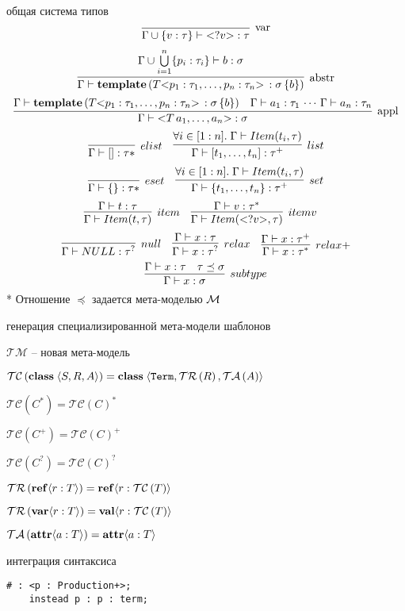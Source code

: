 общая система типов
$$
\trule{}{\Gamma \cup \{v : \tau\} \vdash \ang{?v} : \tau}{var}
$$ 
$$
\trule{
	\Gamma \cup \bigcup\limits_{i=1}^{n} \{ p_i : \tau_i \} \vdash b : \sigma
}{
	\Gamma \vdash \mathbf{template}\left(
		T \ang{p_1 : \tau_1, \ldots, p_n : \tau_n} \,: \sigma \, \{ b \}
	\right)
}{abstr}
$$ 
$$
\trule{
	\Gamma \vdash \mathbf{template}\left(
		T \ang{p_1 : \tau_1, \ldots, p_n : \tau_n} \,: \sigma \, \{ b \}
	\right)
	&
	\Gamma \vdash a_1 : \tau_1 \, \cdots \, \Gamma \vdash a_n : \tau_n
}{
	\Gamma \vdash \ang{T \, a_1, \ldots, a_n} : \sigma
}{appl}
$$
$$
\infer[elist]{\Gamma \vdash [] : \tau*}{}
\quad
\infer[list]{
	\Gamma \vdash [t_1,\ldots,t_n] : \tau^+
}{
	\forall i \in [1:n].\; \Gamma \vdash Item(t_i, \tau)
}
$$
$$
\infer[eset]{\Gamma \vdash \{\} : \tau*}{}
\quad
\infer[set]{
	\Gamma \vdash \{t_1,\ldots,t_n\} : \tau^+
}{
	\forall i \in [1:n].\; \Gamma \vdash Item(t_i, \tau)
}
$$
$$
\infer[item]{
	\Gamma \vdash Item(t, \tau)
}{
	\Gamma \vdash t : \tau
}
\quad
\infer[itemv]{
	\Gamma \vdash Item(\ang{?v}, \tau)
}{
	\Gamma \vdash v : \tau^*
}
\quad
$$
$$
\infer[null]{
	\Gamma \vdash NULL : \tau^?
}{}
\quad
\infer[relax]{
	\Gamma \vdash x : \tau^?
}{
	\Gamma \vdash x : \tau
}
\quad
\infer[relax+]{
	\Gamma \vdash x : \tau^*
}{
	\Gamma \vdash x : \tau^+
}
$$
$$
\infer[subtype]{
	\Gamma \vdash x : \sigma
}{
	\Gamma \vdash x : \tau &
	\tau \preceq \sigma
}
$$
* Отношение $\preceq$ задается мета-моделью $\mathcal{M}$

генерация специализированной мета-модели шаблонов

\newcommand{\TM}{\mathcal{TM}}
\newcommand{\TC}[1]{\mathcal{TC}\left(#1\right)}
\newcommand{\TR}[1]{\mathcal{TR}\left(#1\right)}
\newcommand{\TA}[1]{\mathcal{TA}\left(#1\right)}

$\TM$ -- новая мета-модель

$\TC{\class{}{S}{R}{A}} = \class{}
			{\mathtt{Term}}{\TR{R}}{\TA{A}}$
			
$\TC{C^*} = \TC{C}^*$

$\TC{C^+} = \TC{C}^+$

$\TC{C^?} = \TC{C}^?$

$\TR{\reference{ref}{r}{T}} = \reference{ref}{r}{\TC{T}}$

$\TR{\reference{var}{r}{T}} = \reference{val}{r}{\TC{T}}$

$\TA{\attribute{a}{T}} = \attribute{a}{T}$

интеграция синтаксиса

\begin{lstlisting}
# : <p : Production+>;
	instead p : p : term;
\end{lstlisting}

